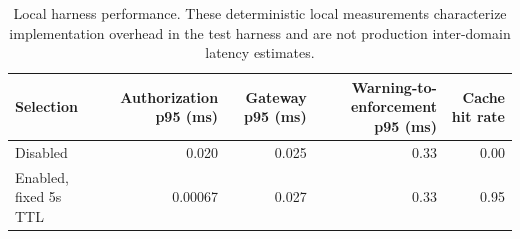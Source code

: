 \begin{table}[t]\centering\small
\caption{Local harness performance. These deterministic local measurements characterize implementation overhead in the test harness and are not production inter-domain latency estimates.}
\begin{tabular}{lrrrr}\toprule
Selection & Authorization p95 (ms) & Gateway p95 (ms) & Warning-to-enforcement p95 (ms) & Cache hit rate \\ \midrule
Disabled & 0.020 & 0.025 & 0.33 & 0.00 \\
Enabled, fixed 5s TTL & 0.00067 & 0.027 & 0.33 & 0.95 \\ \bottomrule
\end{tabular}\label{tab:performance}\end{table}
